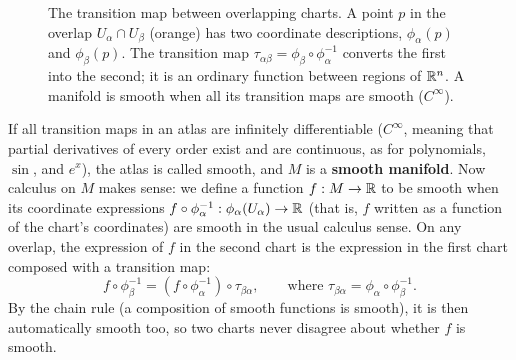 \begin{figure}[htbp]
\caption{The transition map between overlapping charts. A point $p$ in the overlap $U_\alpha \cap U_\beta$ (orange) has two coordinate descriptions, $\phi_\alpha(p)$ and $\phi_\beta(p)$. The transition map $\tau_{\alpha\beta} = \phi_\beta \circ \phi_\alpha^{-1}$ converts the first into the second; it is an ordinary function between regions of $\mathbb{R}^n$. A manifold is smooth when all its transition maps are smooth ($C^\infty$).}\label{23:fig-transition-map}
\end{figure}

If all transition maps in an atlas are infinitely differentiable ($C^\infty$, meaning that partial derivatives of every order exist and are continuous, as for polynomials, $\sin$, and $e^x$), the atlas is called smooth, and $M$ is a \textbf{smooth manifold}. Now calculus on $M$ makes sense: we define a function $f: M \to \mathbb{R}$ to be smooth when its coordinate expressions $f \circ \phi_\alpha^{-1}: \phi_\alpha(U_\alpha) \to \mathbb{R}$ (that is, $f$ written as a function of the chart's coordinates) are smooth in the usual calculus sense. On any overlap, the expression of $f$ in the second chart is the expression in the first chart composed with a transition map:
\[
f \circ \phi_\beta^{-1} = (f \circ \phi_\alpha^{-1}) \circ \tau_{\beta\alpha}, \qquad \text{where } \tau_{\beta\alpha} = \phi_\alpha \circ \phi_\beta^{-1}.
\]
By the chain rule (a composition of smooth functions is smooth), it is then automatically smooth too, so two charts never disagree about whether $f$ is smooth.

